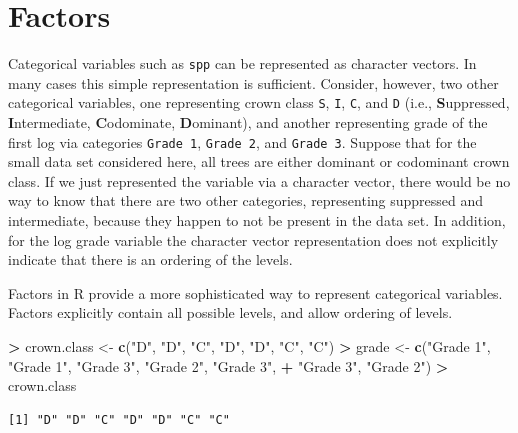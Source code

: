 \documentclass[]{krantz}
\makeatletter
\newenvironment{Shaded}{\begin{snugshade}}{\end{snugshade}}
\newcommand{\KeywordTok}[1]{\textcolor[rgb]{0.27,0.27,0.27}{\textbf{#1}}}
\newcommand{\NormalTok}[1]{#1}
\newcommand{\OperatorTok}[1]{\textcolor[rgb]{0.43,0.43,0.43}{\textbf{#1}}}
\newcommand{\StringTok}[1]{\textcolor[rgb]{0.5,0.5,0.5}{#1}}
\newenvironment{kframe}{%
\medskip{}
\setlength{\fboxsep}{.8em}
 \def\at@end@of@kframe{}%
 \ifinner\ifhmode%
  \def\at@end@of@kframe{\end{minipage}}%
  \begin{minipage}{\columnwidth}%
 \fi\fi%
 \def\FrameCommand##1{\hskip\@totalleftmargin \hskip-\fboxsep
 \colorbox{shadecolor}{##1}\hskip-\fboxsep
     \hskip-\linewidth \hskip-\@totalleftmargin \hskip\columnwidth}%
 \MakeFramed {\advance\hsize-\width
   \@totalleftmargin\z@ \linewidth\hsize
   \@setminipage}}%
 {\par\unskip\endMakeFramed%
 \at@end@of@kframe}
\renewenvironment{Shaded}{\begin{kframe}}{\end{kframe}}
\makeatother
\begin{document}
\hypertarget{factors}{%
\section{Factors}\label{factors}}

Categorical variables such as \texttt{spp} can be represented as character vectors. In many cases this simple representation is sufficient. Consider, however, two other categorical variables, one representing crown class \texttt{S}, \texttt{I}, \texttt{C}, and \texttt{D} (i.e., \textbf{S}uppressed, \textbf{I}ntermediate, \textbf{C}odominate, \textbf{D}ominant), and another representing grade of the first log via categories \texttt{Grade\ 1}, \texttt{Grade\ 2}, and \texttt{Grade\ 3}. Suppose that for the small data set considered here, all trees are either dominant or codominant crown class. If we just represented the variable via a character vector, there would be no way to know that there are two other categories, representing suppressed and intermediate, because they happen to not be present in the data set. In addition, for the log grade variable the character vector representation does not explicitly indicate that there is an ordering of the levels.

Factors in R provide a more sophisticated way to represent categorical variables. Factors explicitly contain all possible levels, and allow ordering of levels.

\begin{Shaded}
\begin{Highlighting}[]
\OperatorTok{>}\StringTok{ }\NormalTok{crown.class <-}\StringTok{ }\KeywordTok{c}\NormalTok{(}\StringTok{"D"}\NormalTok{, }\StringTok{"D"}\NormalTok{, }\StringTok{"C"}\NormalTok{, }\StringTok{"D"}\NormalTok{, }\StringTok{"D"}\NormalTok{, }\StringTok{"C"}\NormalTok{, }\StringTok{"C"}\NormalTok{)}
\OperatorTok{>}\StringTok{ }\NormalTok{grade <-}\StringTok{ }\KeywordTok{c}\NormalTok{(}\StringTok{"Grade 1"}\NormalTok{, }\StringTok{"Grade 1"}\NormalTok{, }\StringTok{"Grade 3"}\NormalTok{, }\StringTok{"Grade 2"}\NormalTok{, }\StringTok{"Grade 3"}\NormalTok{, }
\OperatorTok{+}\StringTok{   "Grade 3"}\NormalTok{, }\StringTok{"Grade 2"}\NormalTok{)}
\OperatorTok{>}\StringTok{ }\NormalTok{crown.class}
\end{Highlighting}
\end{Shaded}

\begin{verbatim}
[1] "D" "D" "C" "D" "D" "C" "C"
\end{verbatim}
\end{document}
